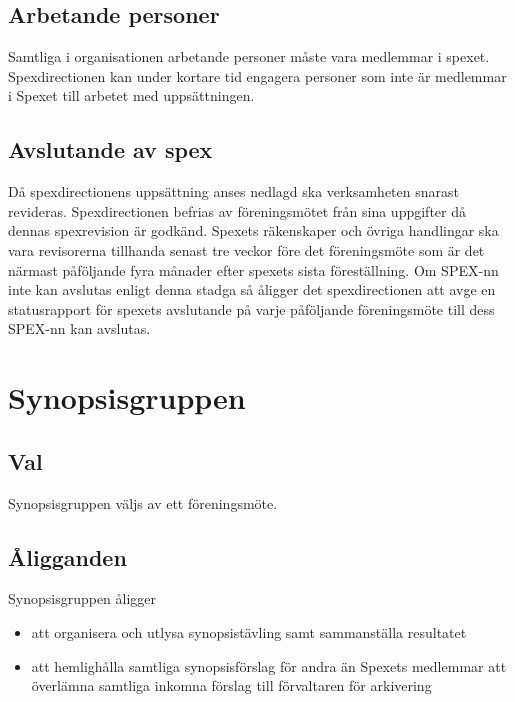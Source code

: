 \documentclass[a4paper]{article}
\begin{document}
\subsection{Arbetande personer}
Samtliga i organisationen arbetande personer måste vara medlemmar i spexet. Spexdirectionen kan under kortare tid engagera personer som inte är medlemmar i Spexet till arbetet med uppsättningen.

\subsection{Avslutande av spex}
Då spexdirectionens uppsättning anses nedlagd ska verksamheten snarast revideras. Spexdirectionen befrias av föreningsmötet från sina uppgifter då dennas spexrevision är godkänd.\newline
\newline
Spexets räkenskaper och övriga handlingar ska vara revisorerna tillhanda senast tre veckor före det föreningsmöte som är det närmast påföljande fyra månader efter spexets sista föreställning.\newline
\newline
Om SPEX-nn inte kan avslutas enligt denna stadga så åligger det spexdirectionen att avge en statusrapport för spexets avslutande på varje påföljande föreningsmöte till dess SPEX-nn kan avslutas.

\section{Synopsisgruppen}
\label{section:synopsisgruppen}

\subsection{Val}
Synopsisgruppen väljs av ett föreningsmöte.

\subsection{Åligganden}
Synopsisgruppen åligger

\begin{itemize}
  \item att organisera och utlysa synopsistävling samt sammanställa resultatet
  \item att hemlighålla samtliga synopsisförslag för andra än Spexets medlemmar att överlämna samtliga inkomna förslag till förvaltaren för arkivering
\end{itemize}
\end{document}
